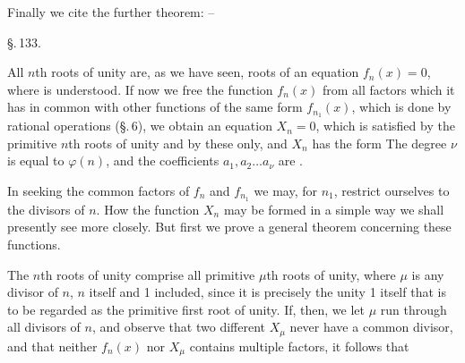 
Finally we cite the further theorem: --


\begin{center}
\S.\,133.\\[0.3em]
\end{center}

All $n$th roots of unity are, as we have seen, roots of an equation $f_n(x) = 0$, where
is understood. If now we free the function $f_n(x)$ from all factors which it has in common with other functions of the same form $f_{n_1}(x)$, which is done by rational operations (\S.\,6), we obtain an equation $X_n = 0$, which is satisfied by the primitive $n$th roots of unity and by these only, and $X_n$ has the form
{}
The degree $\nu$ is equal to $\varphi(n)$, and the coefficients $a_1, a_2 \ldots a_\nu$ are .

In seeking the common factors of $f_n$ and $f_{n_1}$ we may, for $n_1$, restrict ourselves to the divisors of $n$. How the function $X_n$ may be formed in a simple way we shall presently see more closely. But first we prove a general theorem concerning these functions.

The $n$th roots of unity comprise all primitive $\mu$th roots of unity, where $\mu$ is any divisor of $n$, $n$ itself and 1 included, since it is precisely the unity 1 itself that is to be regarded as the primitive first root of unity. If, then, we let $\mu$ run through all divisors of $n$, and observe that two different $X_\mu$ never have a common divisor, and that neither $f_n(x)$ nor $X_\mu$ contains multiple factors, it follows that
